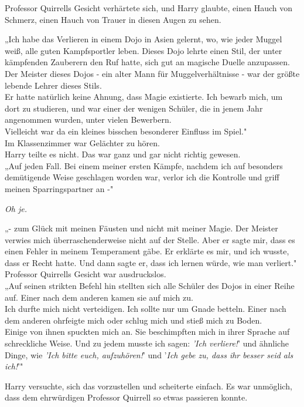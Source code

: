 {Professor Quirrells Gesicht verhärtete sich, und Harry glaubte, einen Hauch von Schmerz, einen Hauch von Trauer in diesen Augen zu sehen.

„Ich habe das Verlieren in einem Dojo in Asien gelernt, wo, wie jeder Muggel weiß, alle guten Kampfsportler leben. Dieses Dojo lehrte einen Stil, der unter kämpfenden Zauberern den Ruf hatte, sich gut an magische Duelle anzupassen.\\ Der Meister dieses Dojos - ein alter Mann für Muggelverhältnisse - war der größte lebende Lehrer dieses Stils.\\ Er hatte natürlich keine Ahnung, dass Magie existierte. Ich bewarb mich, um dort zu studieren, und war einer der wenigen Schüler, die in jenem Jahr angenommen wurden, unter vielen Bewerbern.\\ Vielleicht war da ein kleines bisschen besonderer Einfluss im Spiel."\\ Im Klassenzimmer war Gelächter zu hören.\\ Harry teilte es nicht. Das war ganz und gar nicht richtig gewesen.\\ „Auf jeden Fall. Bei einem meiner ersten Kämpfe, nachdem ich auf besonders demütigende Weise geschlagen worden war, verlor ich die Kontrolle und griff meinen Sparringspartner an -"

\emph{Oh je.}

„- zum Glück mit meinen Fäusten und nicht mit meiner Magie. Der Meister verwies mich überraschenderweise nicht auf der Stelle. Aber er sagte mir, dass es einen Fehler in meinem Temperament gäbe. Er erklärte es mir, und ich wusste, dass er Recht hatte. Und dann sagte er, dass ich lernen würde, wie man verliert."\\ Professor Quirrells Gesicht war ausdruckslos.\\ „Auf seinen strikten Befehl hin stellten sich alle Schüler des Dojos in einer Reihe auf. Einer nach dem anderen kamen sie auf mich zu.\\ Ich durfte mich nicht verteidigen. Ich sollte nur um Gnade betteln. Einer nach dem anderen ohrfeigte mich oder schlug mich und stieß mich zu Boden.\\ Einige von ihnen spuckten mich an. Sie beschimpften mich in ihrer Sprache auf schreckliche Weise. Und zu jedem musste ich sagen: \emph{'Ich verliere!}' und ähnliche Dinge, wie \emph{'Ich bitte euch, aufzuhören!}' und '\emph{Ich gebe zu, dass ihr besser seid als ich!}'"

Harry versuchte, sich das vorzustellen und scheiterte einfach. Es war unmöglich, dass dem ehrwürdigen Professor Quirrell so etwas passieren konnte.

}
